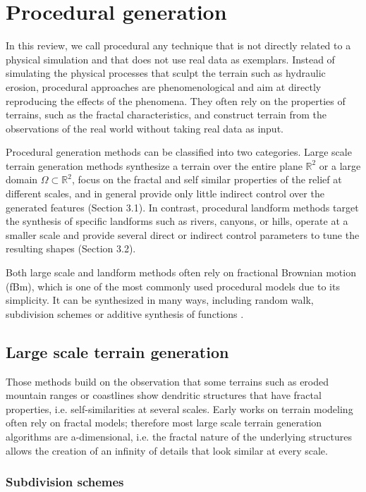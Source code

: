 \documentclass{article}
\begin{document}
\section{Procedural generation}

In this review, we call procedural any technique that is not directly related to a physical simulation and that does not use real data as exemplars. Instead of simulating the physical processes that sculpt the terrain such as hydraulic erosion, procedural approaches are phenomenological and aim at directly reproducing the effects of the phenomena. They often rely on the properties of terrains, such as the fractal characteristics, and construct terrain from the observations of the real world without taking real data as input.

Procedural generation methods can be classified into two categories. Large scale terrain generation methods synthesize a terrain over the entire plane $\mathbb{R}^2$ or a large domain $\Omega \subset \mathbb{R}^2$, focus on the fractal and self similar properties of the relief at different scales, and in general provide only little indirect control over the generated features (Section 3.1). In contrast, procedural landform methods target the synthesis of specific landforms such as rivers, canyons, or hills, operate at a smaller scale and provide several direct or indirect control parameters to tune the resulting shapes (Section 3.2).

Both large scale and landform methods often rely on fractional Brownian motion \cite{MVN68} (fBm), which is one of the most commonly used procedural models due to its simplicity. It can be synthesized in many ways, including random walk, subdivision schemes or additive synthesis of functions \cite{EMP98}.

\subsection{Large scale terrain generation}

Those methods build on the observation that some terrains such as eroded mountain ranges or coastlines show dendritic structures that have fractal properties, i.e. self-similarities at several scales. Early works on terrain modeling often rely on fractal models; therefore most large scale terrain generation algorithms are a-dimensional, i.e. the fractal nature of the underlying structures allows the creation of an infinity of details that look similar at every scale.

\subsubsection{Subdivision schemes}
\end{document}
